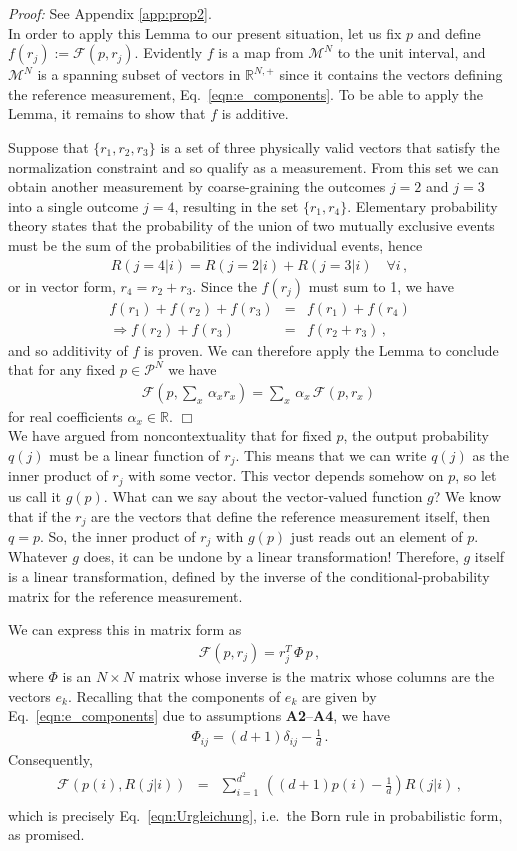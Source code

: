 \documentclass[%
 reprint,superscriptaddress,
 amsmath,amssymb,
 aps,pra, onecolumn, 12pt
]{revtex4-2}
\newcommand{\eqn}[1]{\begin{eqnarray} #1 \end{eqnarray}}
\newcommand{\tit}[1]{\textit{#1}}
\newcommand{\zum}[2]{\displaystyle\sum_{#1}^{#2}}
\begin{document}
\tit{Proof:} See Appendix \ref{app:prop2}.\\

In order to apply this Lemma to our present situation, let us fix $p$ and define $f(r_j) := \mathcal{F}(p,r_j)$. Evidently $f$ is a map from $\mathcal{M}^N$ to the unit interval, and $\mathcal{M}^N$ is a spanning subset of vectors in $\mathbb{R}^{N,+}$ since it contains the vectors defining the reference measurement, Eq.\ \eqref{eqn:e_components}. To be able to apply the Lemma, it remains to show that $f$ is additive.

Suppose that $\{ r_1, r_2, r_3 \}$ is a set of three physically valid vectors that satisfy the normalization constraint and so qualify as a measurement. From this set we can obtain another measurement by coarse-graining the outcomes $j=2$ and $j=3$ into a single outcome $j=4$, resulting in the set $\{r_1, r_4 \}$. Elementary probability theory states that the probability of the union of two mutually exclusive events must be the sum of the probabilities of the individual events, hence
\eqn{
R(j=4|i) = R(j=2|i) + R(j=3|i) \quad \forall i \, ,
}
or in vector form, $r_4 = r_2 + r_3$. Since the $f(r_j)$ must sum to 1, we have
\eqn{
f(r_1) + f(r_2) + f(r_3) &=& f(r_1) + f(r_4) \nonumber \\
\Rightarrow f(r_2) + f(r_3) &=& f(r_2 + r_3) \, ,
}
and so additivity of $f$ is proven. We can therefore apply the Lemma to conclude that for any fixed $p \in \mathcal{P}^N$ we have
\eqn{
\mathcal{F}\left( p, \zum{x}{} \, \alpha_x r_x \right) =  \zum{x}{} \, \alpha_x \, \mathcal{F} \left(p, r_x \right) \,
}
for real coefficients $\alpha_x \in \mathbb{R}$. $\Box$\\

We have argued from noncontextuality that for fixed $p$, the output probability $q(j)$ must be a linear function of $r_j$. This means that we can write $q(j)$ as the inner product of $r_j$ with some vector. This vector depends somehow on $p$, so let us call it $g(p)$. What can we say about the vector-valued function $g$? We know that if the $r_j$ are the vectors that define the reference measurement itself, then $q = p$. So, the inner product of $r_j$ with $g(p)$ just reads out an element of $p$. Whatever $g$ does, it can be undone by a linear transformation! Therefore, $g$ itself is a linear transformation, defined by the inverse of the conditional-probability matrix for the reference measurement.

We can express this in matrix form as
\eqn{ \label{eqn:matrix_urg}
\mathcal{F}(p,r_j) = r_j^T \, \Phi \, p \, ,
}
where $\Phi$ is an $N \times N$ matrix whose inverse is the matrix whose columns are the vectors $e_k$. Recalling that the components of $e_k$ are given by Eq.\ \eqref{eqn:e_components} due to assumptions {\bf A2}--{\bf A4}, we have
\eqn{
\Phi_{ij} = (d+1)\delta_{ij}-\frac{1}{d} \, .
}
Consequently,
\eqn{
\mathcal{F}\left( p(i),R(j|i) \right) &=& \zum{i=1}{d^2}\, \left( (d+1)p(i)-\frac{1}{d} \right) R(j|i) \, , \nonumber\\
}
which is precisely Eq.\  \eqref{eqn:Urgleichung}, i.e.\ the Born rule in probabilistic form, as promised.
\end{document}
